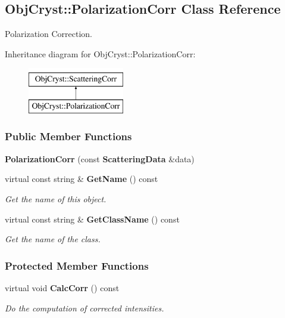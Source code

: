 \subsection{Obj\-Cryst\-:\-:Polarization\-Corr Class Reference}
\label{a00068}


Polarization Correction.  


Inheritance diagram for Obj\-Cryst\-:\-:Polarization\-Corr\-:\begin{figure}[H]
\begin{center}
\leavevmode
\includegraphics[height=2.000000cm]{a00068}
\end{center}
\end{figure}
\subsubsection*{Public Member Functions}
\begin{DoxyCompactItemize}
\item 
{\bfseries Polarization\-Corr} (const {\bf Scattering\-Data} \&data)\label{a00068_a2a4847d1595188d8023f20c9c9d0d4ce}

\item 
virtual const string \& {\bf Get\-Name} () const \label{a00068_a6bfca1f83186379f77e2ee2ef5e65ac5}

\begin{DoxyCompactList}\small\item\em Get the name of this object. \end{DoxyCompactList}\item 
virtual const string \& {\bf Get\-Class\-Name} () const \label{a00068_ae298bdf956280d610cc18aad4acb1af7}

\begin{DoxyCompactList}\small\item\em Get the name of the class. \end{DoxyCompactList}\end{DoxyCompactItemize}
\subsubsection*{Protected Member Functions}
\begin{DoxyCompactItemize}
\item 
virtual void {\bf Calc\-Corr} () const \label{a00068_a3030bd67935be0434c1cebfd385b82a2}

\begin{DoxyCompactList}\small\item\em Do the computation of corrected intensities. \end{DoxyCompactList}\end{DoxyCompactItemize}
